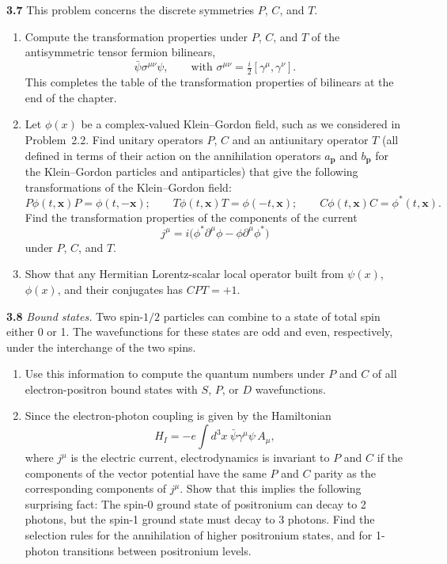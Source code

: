 \textbf{3.7} This problem concerns the discrete symmetries $P$, $C$, and $T$.
\begin{enumerate}[label=(\alph*)]
  \item Compute the transformation properties under $P$, $C$, and $T$ of the
    antisymmetric tensor fermion bilinears,
    \begin{equation}
      \bar{\psi}\sigma^{\mu\nu}\psi,\qquad
      \text{with } \sigma^{\mu\nu} = \tfrac{i}{2}[\gamma^\mu, \gamma^\nu] .
    \end{equation}
    This completes the table of the transformation properties of bilinears at
    the end of the chapter.
  \item Let $\phi(x)$ be a complex-valued Klein--Gordon field, such as we
    considered in Problem~2.2.  Find unitary operators $P$, $C$ and an
    antiunitary operator $T$ (all defined in terms of their action on the
    annihilation operators $a_{\mathbf{p}}$ and $b_{\mathbf{p}}$ for the
    Klein--Gordon particles and antiparticles) that give the following
    transformations of the Klein--Gordon field:
    \begin{equation}
      P\phi(t,\mathbf{x})P = \phi(t,-\mathbf{x});\qquad
      T\phi(t,\mathbf{x})T = \phi(-t,\mathbf{x});\qquad
      C\phi(t,\mathbf{x})C = \phi^{*}(t,\mathbf{x}) .
    \end{equation}
    Find the transformation properties of the components of the current
    \begin{equation}
      j^\mu = i\bigl( \phi^{*}\partial^\mu\phi - \phi\partial^\mu\phi^{*} \bigr)
    \end{equation}
    under $P$, $C$, and $T$.
  \item Show that any Hermitian Lorentz-scalar local operator built from
    $\psi(x)$, $\phi(x)$, and their conjugates has $CPT = +1$.
\end{enumerate}

\textbf{3.8} \emph{Bound states.}  Two spin-$1/2$ particles can combine to a
state of total spin either 0 or 1.  The wavefunctions for these states are
odd and even, respectively, under the interchange of the two spins.
\begin{enumerate}[label=(\alph*)]
  \item Use this information to compute the quantum numbers under $P$ and $C$
    of all electron-positron bound states with $S$, $P$, or $D$ wavefunctions.
  \item Since the electron-photon coupling is given by the Hamiltonian
    \begin{equation}
      H_I = -e\int d^3x\ \bar{\psi}\gamma^\mu\psi\,A_\mu,
    \end{equation}
    where $j^\mu$ is the electric current, electrodynamics is invariant to
    $P$ and $C$ if the components of the vector potential have the same $P$
    and $C$ parity as the corresponding components of $j^\mu$.  Show that
    this implies the following surprising fact: The spin-0 ground state of
    positronium can decay to 2 photons, but the spin-1 ground state must
    decay to 3 photons.  Find the selection rules for the annihilation of
    higher positronium states, and for 1-photon transitions between
    positronium levels.
\end{enumerate}
